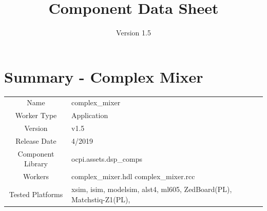 \def\importpath{}

\def\docTitle{Component Data Sheet}
\def\docVersion{1.5}
\date{Version \docVersion} %
\title{\docTitle}
\lhead{\small{\docTitle}}

\def\comp{complex\_mixer}
\edef\ecomp{complex_mixer}
\def\Comp{Complex Mixer}
\graphicspath{ {figures/} }



\section*{Summary - \Comp}
\begin{tabular}{|c|M{13.5cm}|}
	\hline
	                  &                                                    \\
	\hline
	Name              & \comp                                              \\
	\hline
	Worker Type       & Application                                        \\
	\hline
	Version           & v\docVersion \\
	\hline
	Release Date      & 4/2019 \\
	\hline
	Component Library & ocpi.assets.dsp\_comps                              \\
	\hline
	Workers           & \comp.hdl \comp.rcc                                 \\
	\hline
	Tested Platforms  & xsim, isim, modelsim, alst4, ml605, ZedBoard(PL), Matchstiq-Z1(PL), \\
	\hline
\end{tabular}

